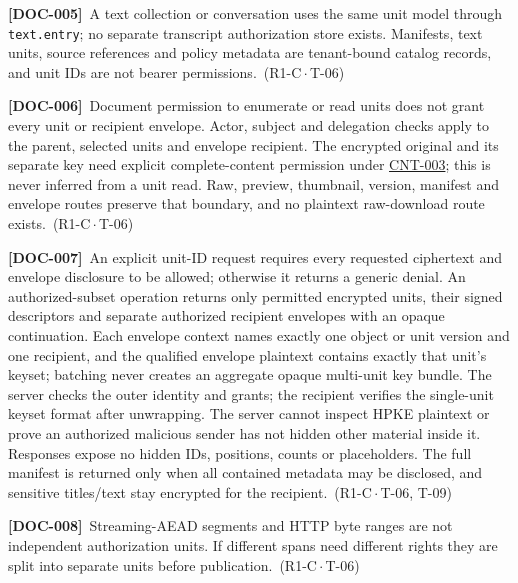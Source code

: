 \documentclass[11pt,a4paper]{article}
\newcommand{\code}[1]{{\small\nolinkurl{#1}}}
\newcommand{\rr}[1]{\hyperlink{req:#1}{#1}}
\newcommand{\reqtag}[2]{{\footnotesize\color{accent}(#1\,$\cdot$\,#2)}}
\newcommand{\req}[4]{\par\noindent\hypertarget{req:#1}{\textbf{[#1]}}\ #4\ \reqtag{#2}{#3}\par}
\begin{document}
\req{DOC-005}{R1-C}{T-06}{A text collection or conversation uses the same unit model through \code{text.entry}; no separate transcript authorization store exists. Manifests, text units, source references and policy metadata are tenant-bound catalog records, and unit IDs are not bearer permissions.}
\req{DOC-006}{R1-C}{T-06}{Document permission to enumerate or read units does not grant every unit or recipient envelope. Actor, subject and delegation checks apply to the parent, selected units and envelope recipient. The encrypted original and its separate key need explicit complete-content permission under \rr{CNT-003}; this is never inferred from a unit read. Raw, preview, thumbnail, version, manifest and envelope routes preserve that boundary, and no plaintext raw-download route exists.}
\req{DOC-007}{R1-C}{T-06, T-09}{An explicit unit-ID request requires every requested ciphertext and envelope disclosure to be allowed; otherwise it returns a generic denial. An authorized-subset operation returns only permitted encrypted units, their signed descriptors and separate authorized recipient envelopes with an opaque continuation. Each envelope context names exactly one object or unit version and one recipient, and the qualified envelope plaintext contains exactly that unit's keyset; batching never creates an aggregate opaque multi-unit key bundle. The server checks the outer identity and grants; the recipient verifies the single-unit keyset format after unwrapping. The server cannot inspect HPKE plaintext or prove an authorized malicious sender has not hidden other material inside it. Responses expose no hidden IDs, positions, counts or placeholders. The full manifest is returned only when all contained metadata may be disclosed, and sensitive titles/text stay encrypted for the recipient.}
\req{DOC-008}{R1-C}{T-06}{Streaming-AEAD segments and HTTP byte ranges are not independent authorization units. If different spans need different rights they are split into separate units before publication.}
\end{document}
